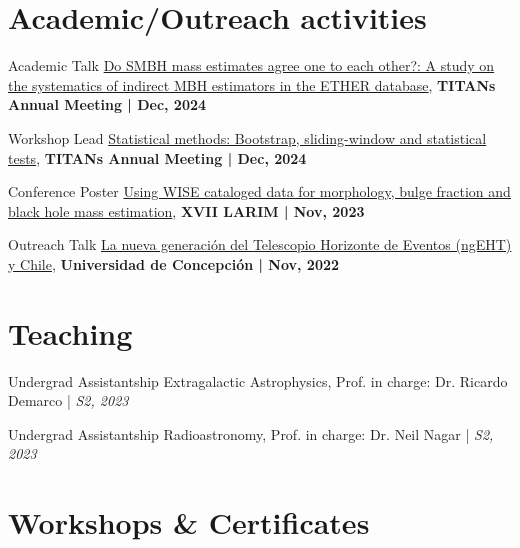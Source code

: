 \documentclass[11pt,a4paper,sans]{moderncv}        %
\begin{document}
\section{Academic/Outreach activities}
    \cvitem
	{Academic Talk}
	{\href{https://joacoh.github.io/talks/2024-12-13-talk}{Do SMBH mass estimates agree one to each other?: A study on the systematics of indirect MBH estimators in the ETHER database}, \textbf{TITANs Annual Meeting | Dec, 2024}}

    \cvitem
	{Workshop Lead}
	{\href{https://joacoh.github.io/talks/2024-12-12-talk}{Statistical methods: Bootstrap, sliding-window and statistical tests}, \textbf{TITANs Annual Meeting | Dec, 2024}}

    \cvitem
	{Conference Poster}
	{\href{https://joacoh.github.io/talks/2023-11-29-talk}{Using WISE cataloged data for morphology, bulge fraction and black hole mass estimation}, \textbf{XVII LARIM | Nov, 2023}}

    \cvitem
	{Outreach Talk}
	{\href{https://joacoh.github.io/talks/2022-11-04-talk}{La nueva generación del Telescopio Horizonte de Eventos (ngEHT) y Chile}, \textbf{Universidad de Concepción | Nov, 2022}}

\section{Teaching}
    \cvitem
	{Undergrad Assistantship}
	{Extragalactic Astrophysics, Prof. in charge: Dr. Ricardo Demarco | \textit{S2, 2023}}

    \cvitem
	{Undergrad Assistantship}
	{Radioastronomy, Prof. in charge: Dr. Neil Nagar | \textit{S2, 2023}}
	
\section{Workshops \& Certificates}



\end{document}
